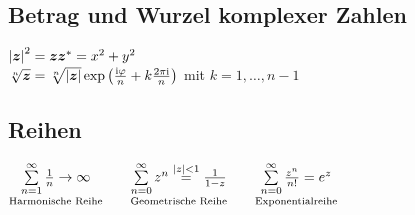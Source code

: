 \documentclass[german,color,5pt]{latex4ei/latex4ei_fs}
\begin{document}
\begin{sectionbox}
	\subsection{Betrag und Wurzel komplexer Zahlen}
	$\left\vert\boldsymbol{z}\right\vert^2 = \boldsymbol{z} \boldsymbol z^* = x^2+y^2$ \\
	 $\sqrt[n]{\boldsymbol{z}}=\sqrt[n]{|\boldsymbol{z}|} \exp \left( \frac{\mathrm{i} \varphi}{n} + k\frac{2\pi\mathrm{i}}{n}\right)$ mit $k=1,\dots,n-1$
\end{sectionbox}

\begin{sectionbox}
	\subsection{Reihen}
	$\underset{\text{Harmonische Reihe}}{\sum\limits_{n=1}^\infty \frac{1}{n} \rightarrow \infty} \qquad   \underset{\text{Geometrische Reihe}}{\sum\limits_{n=0}^\infty z^n \stackrel{|z|<1}= \frac{1}{1-z}}  \qquad \underset{\text{Exponentialreihe}}{\sum\limits_{n = 0}^{\infty} \frac{z^n}{n!} = e^z}$
\end{sectionbox}

%	
	

\end{document}
